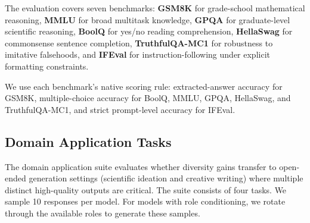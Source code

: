 The evaluation covers seven benchmarks: \textbf{GSM8K} \citep{cobbe2021gsm8k} for grade-school mathematical reasoning, \textbf{MMLU} \citep{hendryckstest2021} for broad multitask knowledge, \textbf{GPQA} \citep{rein2024gpqa} for graduate-level scientific reasoning, \textbf{BoolQ} \citep{clark2019boolq} for yes/no reading comprehension, \textbf{HellaSwag} \citep{zellers2019hellaswag} for commonsense sentence completion, \textbf{TruthfulQA-MC1} \citep{lin2022truthfulqameasuringmodelsmimic} for robustness to imitative
falsehoods, and \textbf{IFEval} \citep{zhou2023instructionfollowingevaluationlargelanguage} for instruction-following under explicit formatting constraints.

We use each benchmark's native scoring rule: extracted-answer accuracy for GSM8K, multiple-choice accuracy for BoolQ, MMLU, GPQA, HellaSwag, and TruthfulQA-MC1, and strict prompt-level accuracy for IFEval.

\subsection{Domain Application Tasks}
\label{app:domain application}

The domain application suite evaluates whether diversity gains transfer to open-ended generation settings (scientific ideation and creative writing) where multiple distinct high-quality outputs are critical. The suite consists of four tasks. We sample 10 responses per model. For models with role conditioning, we rotate through the available roles to generate these samples.

